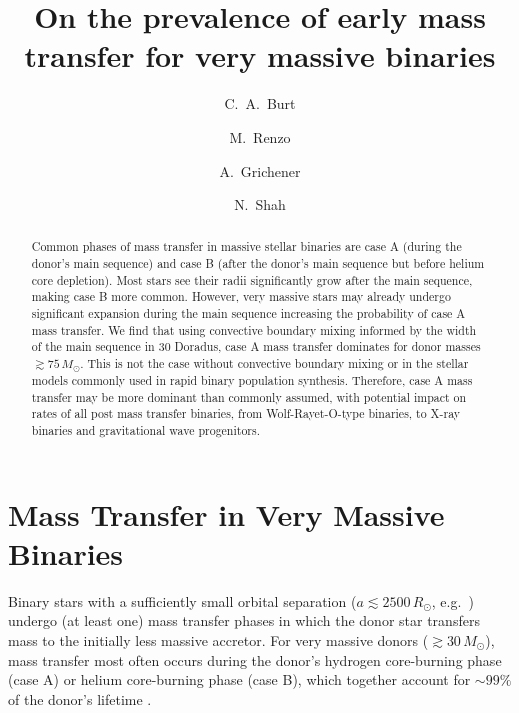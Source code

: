 \documentclass[twocolumn]{aastex63}
\begin{document}
\title{On the prevalence of early mass transfer for very massive binaries}

\author[0009-0008-2061-4946]{C.~A.~Burt}

\author[0000-0002-6718-9472]{M.~Renzo}

\author[0000-0002-2215-1841]{A.~Grichener}

\author[0000-0002-8465-8090]{N.~Shah}

\begin{abstract}
  Common phases of mass transfer in massive stellar binaries are case
  A (during the donor's main sequence) and case B (after the donor's
  main sequence but before helium core depletion). Most stars see
  their radii significantly grow after the main sequence, making case
  B more common. However, very massive stars may already undergo
  significant expansion during the main sequence increasing the
  probability of case A mass transfer. We find that using convective
  boundary mixing informed by the width of the main sequence in 30
  Doradus, case A mass transfer dominates for donor masses
  $\gtrsim 75 \, M_{\odot}$. This is not the case without convective
  boundary mixing or in the stellar models commonly used in rapid
  binary population synthesis.  Therefore, case A mass transfer may be
  more dominant than commonly assumed, with potential impact on rates
  of all post mass transfer binaries, from Wolf-Rayet-O-type binaries,
  to X-ray binaries and gravitational wave progenitors.
\end{abstract}

\section{Mass Transfer in Very Massive Binaries}

Binary stars with a sufficiently small orbital separation
($a\lesssim2500\,R_{\odot}$, e.g.~\citealt{sana:12}) undergo (at least
one) mass transfer phases in which the donor star transfers mass to
the initially less massive accretor. For very massive donors
($ \gtrsim 30 \, M_{\odot}$), mass transfer most often occurs during
the donor's hydrogen core-burning phase (case A) or helium
core-burning phase (case B), which together account for $\sim99\%$ of
the donor's lifetime \citep{kippenhahn:67}.
\end{document}
